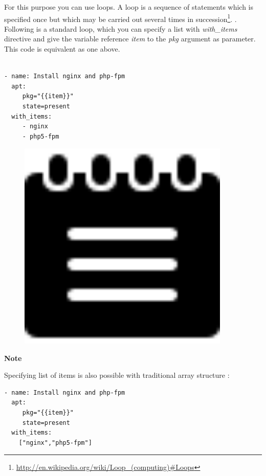 \documentclass[10pt]{book}
\begin{document}
For this purpose you can use loops. A loop is a sequence of statements which is specified 
once but which may be carried out several times in succession\footnote {\url{http://en.wikipedia.org/wiki/Loop_(computing)#Loops}}. .
Following is a standard loop, which you can specify a list with \emph{with\_items} directive 
and give the variable reference \emph{item} to the \emph{pkg} argument as 
parameter. This code is equivalent as one above.

\begin{Verbatim} 

- name: Install nginx and php-fpm 
  apt: 
     pkg="{{item}}" 
     state=present
  with_items:
     - nginx
     - php5-fpm

\end{Verbatim}

\begin{mdframed}[style=noteStyle]
\begin{minipage}[b]{0.05\textwidth}
\begin{figure}[H]
\includegraphics[width=0.9\textwidth]{figures/notes-icon.png} 
\end{figure}
\end{minipage}  
\begin{minipage}[b]{0.05\textwidth}
\textbf{Note}
\end{minipage}

Specifying list of items is also possible with traditional array structure :

\begin{Verbatim} 
- name: Install nginx and php-fpm 
  apt: 
     pkg="{{item}}" 
     state=present
  with_items: 
    ["nginx","php5-fpm"]
\end{Verbatim}

\end{mdframed}
 
\end{document}
